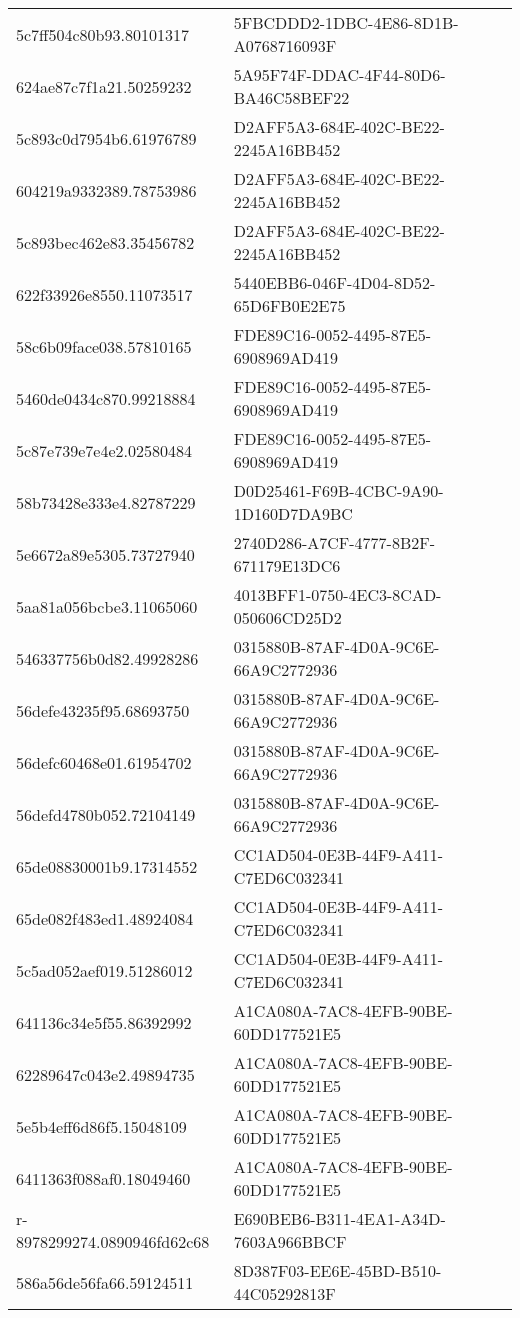 \begin{tabular}{ll}
5c7ff504c80b93.80101317 & 5FBCDDD2-1DBC-4E86-8D1B-A0768716093F \\
624ae87c7f1a21.50259232 & 5A95F74F-DDAC-4F44-80D6-BA46C58BEF22 \\
5c893c0d7954b6.61976789 & D2AFF5A3-684E-402C-BE22-2245A16BB452 \\
604219a9332389.78753986 & D2AFF5A3-684E-402C-BE22-2245A16BB452 \\
5c893bec462e83.35456782 & D2AFF5A3-684E-402C-BE22-2245A16BB452 \\
622f33926e8550.11073517 & 5440EBB6-046F-4D04-8D52-65D6FB0E2E75 \\
58c6b09face038.57810165 & FDE89C16-0052-4495-87E5-6908969AD419 \\
5460de0434c870.99218884 & FDE89C16-0052-4495-87E5-6908969AD419 \\
5c87e739e7e4e2.02580484 & FDE89C16-0052-4495-87E5-6908969AD419 \\
58b73428e333e4.82787229 & D0D25461-F69B-4CBC-9A90-1D160D7DA9BC \\
5e6672a89e5305.73727940 & 2740D286-A7CF-4777-8B2F-671179E13DC6 \\
5aa81a056bcbe3.11065060 & 4013BFF1-0750-4EC3-8CAD-050606CD25D2 \\
546337756b0d82.49928286 & 0315880B-87AF-4D0A-9C6E-66A9C2772936 \\
56defe43235f95.68693750 & 0315880B-87AF-4D0A-9C6E-66A9C2772936 \\
56defc60468e01.61954702 & 0315880B-87AF-4D0A-9C6E-66A9C2772936 \\
56defd4780b052.72104149 & 0315880B-87AF-4D0A-9C6E-66A9C2772936 \\
65de08830001b9.17314552 & CC1AD504-0E3B-44F9-A411-C7ED6C032341 \\
65de082f483ed1.48924084 & CC1AD504-0E3B-44F9-A411-C7ED6C032341 \\
5c5ad052aef019.51286012 & CC1AD504-0E3B-44F9-A411-C7ED6C032341 \\
641136c34e5f55.86392992 & A1CA080A-7AC8-4EFB-90BE-60DD177521E5 \\
62289647c043e2.49894735 & A1CA080A-7AC8-4EFB-90BE-60DD177521E5 \\
5e5b4eff6d86f5.15048109 & A1CA080A-7AC8-4EFB-90BE-60DD177521E5 \\
6411363f088af0.18049460 & A1CA080A-7AC8-4EFB-90BE-60DD177521E5 \\
r-8978299274.0890946fd62c68 & E690BEB6-B311-4EA1-A34D-7603A966BBCF \\
586a56de56fa66.59124511 & 8D387F03-EE6E-45BD-B510-44C05292813F \\

\end{tabular}
